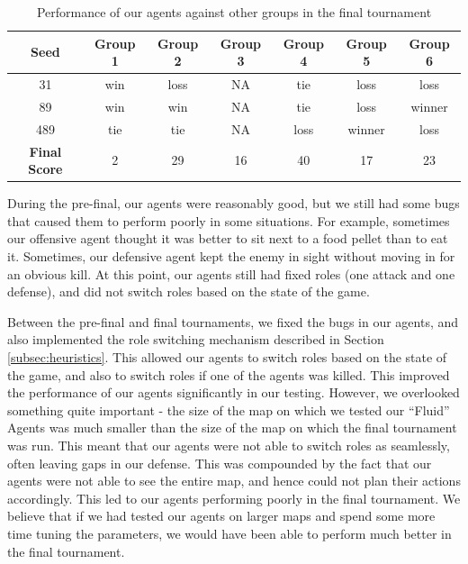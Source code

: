 \documentclass[a4paper,12pt]{article}
\begin{document}


\begin{table}[!hptb]
  \centering
  \begin{tabular}{|c|c|c|c|c|c|c|}
    \hline
    \textbf{Seed} & \textbf{Group 1} & \textbf{Group 2} & \textbf{Group 3} & \textbf{Group 4} & \textbf{Group 5} & \textbf{Group 6} \\
    \hline
    31 & win & loss & NA & tie & loss & loss \\
    \hline
    89 & win & win & NA & tie & loss & winner \\
    \hline
    489 & tie & tie & NA & loss & winner & loss \\
    \hline
    \textbf{Final Score} & 2 & 29 & 16 & 40 & 17 & 23 \\
    \hline

  \end{tabular}
  \caption{Performance of our agents against other groups in the final tournament}
  \label{tab:results_final}
\end{table}

During the pre-final, our agents were reasonably good, but we still had some bugs that caused them to perform poorly in some situations. For example, sometimes our offensive agent thought it was better to sit next to a food pellet than to eat it. Sometimes, our defensive agent kept the enemy in sight without moving in for an obvious kill. At this point, our agents still had fixed roles (one attack and one defense), and did not switch roles based on the state of the game.

Between the pre-final and final tournaments, we fixed the bugs in our agents, and also implemented the role switching mechanism described in Section \ref{subsec:heuristics}. This allowed our agents to switch roles based on the state of the game, and also to switch roles if one of the agents was killed. This improved the performance of our agents significantly in our testing. However, we overlooked something quite important - the size of the map on which we tested our ``Fluid'' Agents was much smaller than the size of the map on which the final tournament was run. This meant that our agents were not able to switch roles as seamlessly, often leaving gaps in our defense. This was compounded by the fact that our agents were not able to see the entire map, and hence could not plan their actions accordingly. This led to our agents performing poorly in the final tournament. We believe that if we had tested our agents on larger maps and spend some more time tuning the parameters, we would have been able to perform much better in the final tournament.
\end{document}

